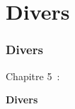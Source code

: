 %

\section{Divers}
\begin{frame}[fragile]
	\frametitle{Divers}

	\begin{center}\huge{Chapitre 5~:}\end{center}
	\begin{center}\huge{\color{typo3darkgrey}\textbf{Divers}}\end{center}

\end{frame}

